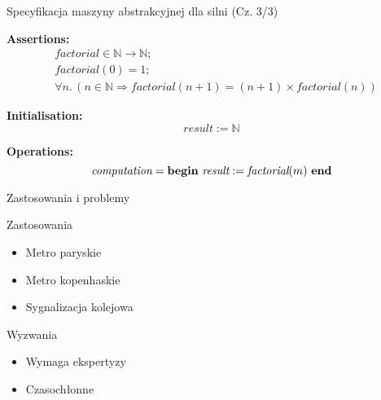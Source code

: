 \documentclass{beamer}
\begin{document}
\begin{frame}{Specyfikacja maszyny abstrakcyjnej dla silni (Cz. 3/3)}
\begin{tcolorbox}[colback=white, colframe=blue!30!black, title=Machine FACTORIAL\_MAC]
\textbf{Assertions:}
\[
\begin{aligned}
& \textit{factorial} \in \mathbb{N} \rightarrow \mathbb{N}; \\
& \textit{factorial}(0) = 1; \\
& \forall n.\,(n \in \mathbb{N} \Rightarrow \textit{factorial}(n+1) = (n+1) \times \textit{factorial}(n))
\end{aligned}
\]

\textbf{Initialisation:}
\[
\textit{result} := \mathbb{N}
\]

\textbf{Operations:}
\[
\textit{computation} = \text{\textbf{begin}}\ \textit{result} := \textit{factorial}(m)\ \text{\textbf{end}}
\]
\end{tcolorbox}
\end{frame}

\begin{frame}{Zastosowania i problemy}
\begin{exampleblock}{Zastosowania}
\begin{itemize}
\item Metro paryskie
\item Metro kopenhaskie
\item Sygnalizacja kolejowa
\end{itemize}
\end{exampleblock}

\begin{alertblock}{Wyzwania}
\begin{itemize}
\item Wymaga ekspertyzy
\item Czasochłonne
\end{itemize}
\end{alertblock}
\end{frame}
\end{document}
